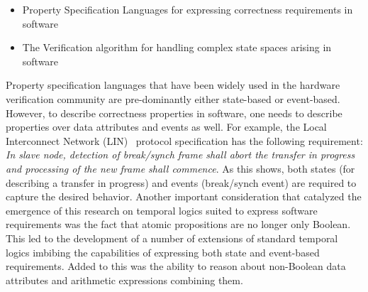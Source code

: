 \begin{itemize}
\item Property Specification Languages 
	 for expressing correctness requirements in software 
\item The Verification algorithm for handling complex state spaces arising 
	in software
\end{itemize}

\noindent
Property specification languages that have been widely used in
the hardware verification community are pre-dominantly either
state-based or event-based. However, to describe correctness properties 
in software, one needs to describe properties over data attributes and 
events as well. For example, the Local Interconnect Network
(LIN)~\cite{lin} protocol specification has the following requirement:
{\em In slave node, detection of break/synch frame shall abort
the transfer in progress and processing of the new frame shall
commence}. As this shows, both states (for describing a transfer in progress)
and events (break/synch event) are required to
capture the desired behavior. Another important consideration that catalyzed 
the emergence of this research on temporal logics suited to express 
software requirements was the fact that atomic propositions are no longer 
only Boolean. This led to the development of a number of 
extensions of standard temporal logics imbibing the capabilities of 
expressing both state and event-based requirements. Added to this was 
the ability to reason about non-Boolean data attributes and arithmetic 
expressions combining them. 

